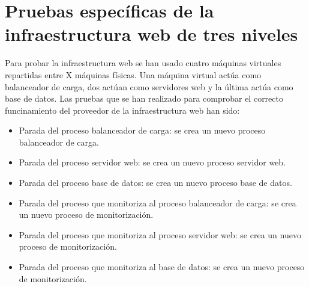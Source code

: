 \section{Pruebas específicas de la infraestructura web de tres niveles}

Para probar la infraestructura web se han usado cuatro máquinas virtuales repartidas entre X máquinas físicas. Una máquina virtual actúa como balanceador de carga, dos actúan como servidores web y la última actúa como base de datos. Las pruebas que se han realizado para comprobar el correcto funcinamiento del proveedor de la infraestructura web han sido:

\begin{itemize}
\item Parada del proceso balanceador de carga: se crea un nuevo proceso balanceador de carga.
\item Parada del proceso servidor web: se crea un nuevo proceso servidor web.
\item Parada del proceso base de datos: se crea un nuevo proceso base de datos.
\item Parada del proceso que monitoriza al proceso balanceador de carga: se crea un nuevo proceso de monitorización.
\item Parada del proceso que monitoriza al proceso servidor web: se crea un nuevo proceso de monitorización.
\item Parada del proceso que monitoriza al base de datos: se crea un nuevo proceso de monitorización.
\end{itemize}
